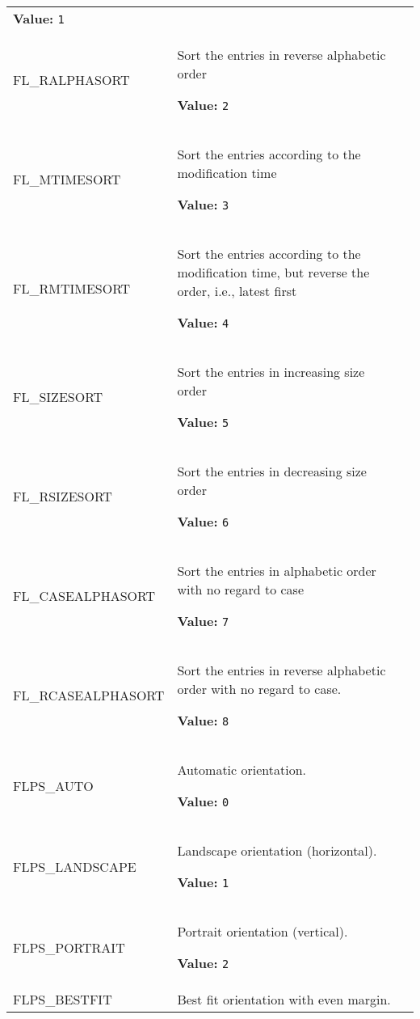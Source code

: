 \begin{longtable}{|p{\varnamewidth}|p{\vardescrwidth}|l}
\textbf{Value:} 
{\tt 1}&\\
\cline{1-2}
\raggedright F\-L\-\_\-R\-A\-L\-P\-H\-A\-S\-O\-R\-T\- & \raggedright Sort the entries in reverse alphabetic order

\textbf{Value:} 
{\tt 2}&\\
\cline{1-2}
\raggedright F\-L\-\_\-M\-T\-I\-M\-E\-S\-O\-R\-T\- & \raggedright Sort the entries according to the modification time

\textbf{Value:} 
{\tt 3}&\\
\cline{1-2}
\raggedright F\-L\-\_\-R\-M\-T\-I\-M\-E\-S\-O\-R\-T\- & \raggedright Sort the entries according to the modification time, but reverse 
          the order, i.e., latest first

\textbf{Value:} 
{\tt 4}&\\
\cline{1-2}
\raggedright F\-L\-\_\-S\-I\-Z\-E\-S\-O\-R\-T\- & \raggedright Sort the entries in increasing size order

\textbf{Value:} 
{\tt 5}&\\
\cline{1-2}
\raggedright F\-L\-\_\-R\-S\-I\-Z\-E\-S\-O\-R\-T\- & \raggedright Sort the entries in decreasing size order

\textbf{Value:} 
{\tt 6}&\\
\cline{1-2}
\raggedright F\-L\-\_\-C\-A\-S\-E\-A\-L\-P\-H\-A\-S\-O\-R\-T\- & \raggedright Sort the entries in alphabetic order with no regard to case

\textbf{Value:} 
{\tt 7}&\\
\cline{1-2}
\raggedright F\-L\-\_\-R\-C\-A\-S\-E\-A\-L\-P\-H\-A\-S\-O\-R\-T\- & \raggedright Sort the entries in reverse alphabetic order with no regard to 
          case.

\textbf{Value:} 
{\tt 8}&\\
\cline{1-2}
\raggedright F\-L\-P\-S\-\_\-A\-U\-T\-O\- & \raggedright Automatic orientation.

\textbf{Value:} 
{\tt 0}&\\
\cline{1-2}
\raggedright F\-L\-P\-S\-\_\-L\-A\-N\-D\-S\-C\-A\-P\-E\- & \raggedright Landscape  orientation (horizontal).

\textbf{Value:} 
{\tt 1}&\\
\cline{1-2}
\raggedright F\-L\-P\-S\-\_\-P\-O\-R\-T\-R\-A\-I\-T\- & \raggedright Portrait orientation (vertical).

\textbf{Value:} 
{\tt 2}&\\
\cline{1-2}
\raggedright F\-L\-P\-S\-\_\-B\-E\-S\-T\-F\-I\-T\- & \raggedright Best fit orientation with even margin.


\end{longtable}
